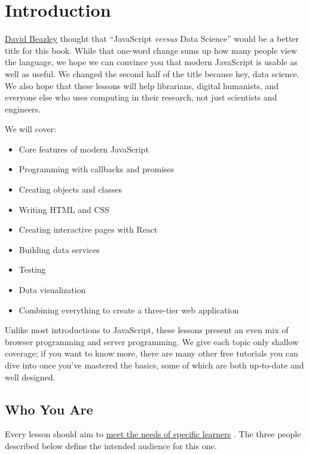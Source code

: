 \chapter{Introduction}\label{s:intro}

\href{https://www.dabeaz.com/}{David Beazley} thought that ``JavaScript \emph{versus} Data Science''
would be a better title for this book.
While that one-word change sums up how many people view the language,
we hope we can convince you that modern JavaScript is usable as well as useful.
We changed the second half of the title because hey, data science.
We also hope that these lessons will help librarians,
digital humanists,
and everyone else who uses computing in their research,
not just scientists and engineers.

We will cover:

\begin{itemize}
\item
  Core features of modern JavaScript
\item
  Programming with callbacks and promises
\item
  Creating objects and classes
\item
  Writing HTML and CSS
\item
  Creating interactive pages with React
\item
  Building data services
\item
  Testing
\item
  Data visualization
\item
  Combining everything to create a three-tier web application
\end{itemize}

Unlike most introductions to JavaScript,
these lessons present an even mix of browser programming and server programming.
We give each topic only shallow coverage;
if you want to know more,
there are many other free tutorials you can dive into once you've mastered the basics,
some of which are both up-to-date and well designed.

\section{Who You Are}\label{s:intro-personas}

Every lesson should aim to \href{http://teachtogether.tech/en/process/}{meet the needs of specific learners} \cite{Wils2018}.
The three people described below define the intended audience for this one.

